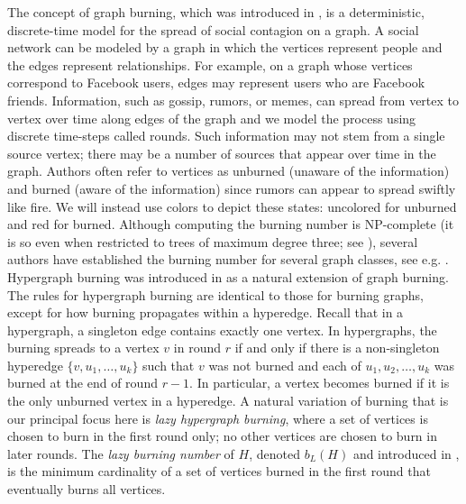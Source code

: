 \documentclass[12pt]{article}
\theoremstyle{plain}
\theoremstyle{definition}
\theoremstyle{remark}
\begin{document}
The concept of graph burning, which was introduced in \cite{originburning}, is a deterministic, discrete-time model for the spread of social contagion on a graph. A social network can be modeled by a graph in which the vertices represent people and the edges represent relationships. For example, on a graph whose vertices correspond to Facebook users, edges may represent users who are Facebook friends. Information, such as gossip, rumors, or memes, can spread from vertex to vertex over time along edges of the graph and we model the process using discrete time-steps called rounds. Such information may not stem from a single source vertex; there may be a number of sources that appear over time in the graph. Authors often refer to vertices as unburned (unaware of the information) and burned (aware of the information) since rumors can appear to spread swiftly like fire. We will instead use colors to depict these states: uncolored for unburned and red for burned. Although computing the burning number is NP-complete (it is so even when restricted
to trees of maximum degree three; see \cite[Theorem 6]{bessy2017}), several authors have established the burning number for several graph classes, see e.g. \cite{A1992,TN2025}. Hypergraph burning was introduced in \cite{Burgess2024ExtendingGB} as a natural extension of graph burning. The rules for hypergraph burning are identical to those for burning graphs, except for how burning propagates within a hyperedge. Recall that in a hypergraph, a singleton edge contains exactly one vertex. In hypergraphs, the
burning spreads to a vertex $v$ in round $r$ if and only if there is a non-singleton
hyperedge $\{v, u_1,\dots, u_k\}$ such that $v$ was not burned and each of $u_1, u_2,\dots, u_k$ was burned at the end of round $r-1$. In particular, a vertex becomes burned if it is the only unburned vertex in a hyperedge. A natural variation of burning that is our principal focus here is \emph{lazy hypergraph burning}, where a set of vertices is chosen to burn in the first round only; no other vertices are chosen to burn in later rounds. The \emph{lazy burning number} of $H$, denoted $b_L(H)$ and introduced in \cite{hypergraph}, is the minimum cardinality of a set of vertices burned in the first round that eventually burns all vertices.
\end{document}
